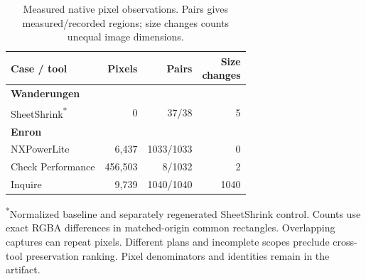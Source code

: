 \begin{table}[t]
\centering
\footnotesize
\setlength{\tabcolsep}{3pt}
\caption{Measured native pixel observations. Pairs gives measured/recorded regions; size changes counts unequal image dimensions.}
\label{tab:case-study-native}
\begin{tabular}{lrrr}
\hline
Case / tool & Pixels & Pairs & \shortstack{Size\\changes} \\
\hline
\multicolumn{4}{l}{\textbf{Wanderungen}} \\
SheetShrink\textsuperscript{*} & 0 & 37/38 & 5 \\
\hline
\multicolumn{4}{l}{\textbf{Enron}} \\
NXPowerLite & 6,437 & 1033/1033 & 0 \\
Check Performance & 456,503 & 8/1032 & 2 \\
Inquire & 9,739 & 1040/1040 & 1040 \\
\hline
\end{tabular}
\par\smallskip
\begin{minipage}{\columnwidth}\footnotesize \textsuperscript{*}Normalized baseline and separately regenerated SheetShrink control. Counts use exact RGBA differences in matched-origin common rectangles. Overlapping captures can repeat pixels. Different plans and incomplete scopes preclude cross-tool preservation ranking. Pixel denominators and identities remain in the artifact.\end{minipage}
\end{table}
